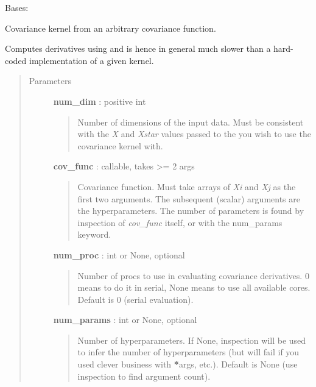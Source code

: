 \documentclass[letterpaper,10pt,english]{sphinxmanual}
\begin{document}
\begin{fulllineitems}
\label{gptools.kernel:gptools.kernel.core.ArbitraryKernel}
Bases: {\hyperref[gptools.kernel:gptools.kernel.core.Kernel]{}}

Covariance kernel from an arbitrary covariance function.

Computes derivatives using  and is hence in general
much slower than a hard-coded implementation of a given kernel.
\begin{quote}\begin{description}
\item[{Parameters}] \leavevmode
\textbf{num\_dim} : positive int
\begin{quote}

Number of dimensions of the input data. Must be consistent with the \emph{X}
and \emph{Xstar} values passed to the
{\hyperref[gptools:gptools.gaussian_process.GaussianProcess]{}} you wish to use
the covariance kernel with.
\end{quote}

\textbf{cov\_func} : callable, takes \textgreater{}= 2 args
\begin{quote}

Covariance function. Must take arrays of \emph{Xi} and \emph{Xj} as the
first two arguments. The subsequent (scalar) arguments are the
hyperparameters. The number of parameters is found by inspection of
\emph{cov\_func} itself, or with the num\_params keyword.
\end{quote}

\textbf{num\_proc} : int or None, optional
\begin{quote}

Number of procs to use in evaluating covariance derivatives. 0 means
to do it in serial, None means to use all available cores. Default is
0 (serial evaluation).
\end{quote}

\textbf{num\_params} : int or None, optional
\begin{quote}

Number of hyperparameters. If None, inspection will be used to infer
the number of hyperparameters (but will fail if you used clever business
with {\color{red}\bfseries{}*}args, etc.). Default is None (use inspection to find argument
count).
\end{quote}


\end{description}
\end{quote}
\end{fulllineitems}
\end{document}
